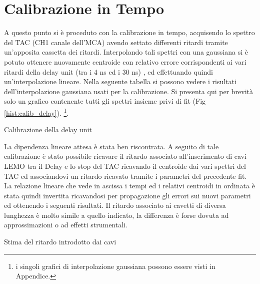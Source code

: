 


\section{Calibrazione in Tempo}

A questo punto si è proceduto con la calibrazione in tempo, acquisendo lo spettro del TAC (CH1 canale dell'MCA) avendo settato differenti ritardi tramite 
un'apposita cassetta dei ritardi. Interpolando tali spettri con una gaussiana si è potuto ottenere nuovamente centroide con relativo 
errore corrispondenti ai vari ritardi della delay unit (tra i 4 ns ed i 30 ns) ,
ed effettuando quindi un'interpolazione lineare. Nella seguente tabella si possono vedere i risultati dell'interpolazione gaussiana usati per la calibrazione. Si presenta qui per brevità solo un grafico contenente tutti gli spettri insieme privi di fit (Fig \ref{hist:calib_delay}). \footnote{i singoli grafici di interpolazione gaussiana possono essere visti in Appendice.}. \\


%
\begin{table}[h]
	\centering
	
	\caption{Calibrazione della delay unit}
	\label{tab:calib_delay}
\end{table}
%
%
%	
%

%

La dipendenza lineare attesa è stata ben riscontrata.
A seguito di tale calibrazione è stato possibile ricavare il ritardo associato all'inserimento di cavi LEMO tra il Delay e lo stop del TAC ricavando il centroide dai vari spettri del 
TAC ed associandovi un ritardo ricavato tramite i parametri del precedente fit. La relazione lineare che vede in ascissa i tempi ed i relativi centroidi in ordinata è stata 
quindi invertita ricavandosi per propagazione gli errori sui nuovi parametri ed ottenendo i seguenti risultati. Il ritardo associato ai cavetti di diversa lunghezza è molto simile
a quello indicato, la differenza è forse dovuta ad approssimazioni o ad effetti strumentali.\\



\begin{table}[h]
	\centering
	
	\caption{Stima del ritardo introdotto dai cavi}
	\label{tab:calib_cavi}
\end{table}
 
